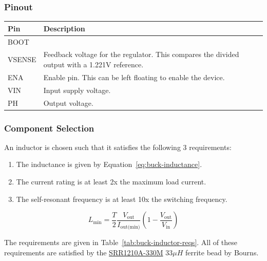 \subsubsection{Pinout}
\label{sec:tps5420d-pinout}

\label{tab:tps5420d-pinout}
\begin{tabularx}{\textwidth}{l X>{\raggedright\arraybackslash}X}
        \caption{TPS5420D pinout.} \\
        \toprule
        \textbf{Pin} & \textbf{Description} \\
        \midrule \endhead
        BOOT & \\
        VSENSE & Feedback voltage for the regulator. This compares the divided output with a 1.221V
        reference. \\
        ENA & Enable pin. This can be left floating to enable the device. \\
        VIN & Input supply voltage. \\
        PH & Output voltage. \\
        \bottomrule
\end{tabularx}

\subsubsection{Component Selection}
\label{sec:tps5420d-component-selection}

An inductor is chosen such that it satisfies the following 3 requirements:
\begin{enumerate}
\item The inductance is given by Equation~\ref{eq:buck-inductance}.
\item The current rating is at least 2x the maximum load current.
\item The self-resonant frequency is at least 10x the switching frequency.
\end{enumerate}

\begin{equation}
        \label{eq:buck-inductance}
        L_{\text{min}} = \frac{T}{2} \frac{V_{\text{out}}}{I_{\text{out(min)}}} \left(1 -
                \frac{V_{\text{out}}}{V_{\text{in}}}\right)
\end{equation}

The requirements are given in Table~\ref{tab:buck-inductor-reqs}. All of these requirements are
satisfied by the \href{https://www.bourns.com/docs/Product-Datasheets/SRR1210A.pdf}{SRR1210A-330M}
$33\si{\mu H}$ ferrite bead by Bourns.

